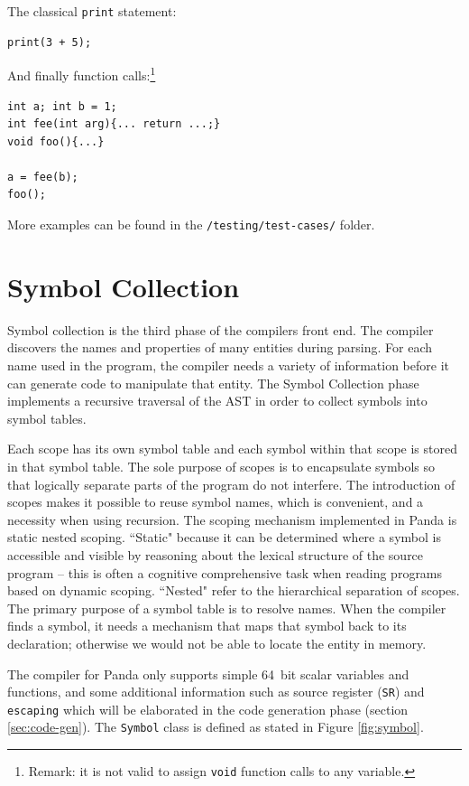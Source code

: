 The classical \texttt{print} statement:

\begin{verbatim}
print(3 + 5); 
\end{verbatim}

And finally function calls:\footnote{Remark: it is not valid to assign \texttt{void} function calls to any variable.}

\begin{verbatim}
int a; int b = 1;
int fee(int arg){... return ...;}
void foo(){...}

a = fee(b);
foo();
\end{verbatim}

More examples can be found in the \texttt{/testing/test-cases/} folder.

\newpage

\section{Symbol Collection}\label{sec:symbol_collection}
Symbol collection is the third phase of the compilers front end. The compiler discovers the names and properties of many entities during parsing. For each name used in the program, the compiler needs a variety of information before it can generate code to manipulate that entity. The Symbol Collection phase implements a recursive traversal of the AST in order to collect symbols into symbol tables.

Each scope has its own symbol table and each symbol within that scope is stored in that symbol table. The sole purpose of scopes is to encapsulate symbols so that logically separate parts of the program do not interfere. The introduction of scopes makes it possible to reuse symbol names, which is convenient, and a necessity when using recursion. The scoping mechanism implemented in Panda is static nested scoping. ``Static" because it can be determined where a symbol is accessible and visible by reasoning about the lexical structure of the source program -- this is often a cognitive comprehensive task when reading programs based on dynamic scoping. ``Nested" refer to the hierarchical separation of scopes. The primary purpose of a symbol table is to resolve names. When the compiler finds a symbol, it needs a mechanism that maps that symbol back to its declaration; otherwise we would not be able to locate the entity in memory.

The compiler for Panda only supports simple \SI{64}{bit} scalar variables and functions, and some additional information such as source register (\texttt{SR}) and \texttt{escaping} which will be elaborated in the code generation phase (section \ref{sec:code-gen}). The \texttt{Symbol} class is defined as stated in Figure \ref{fig:symbol}.

